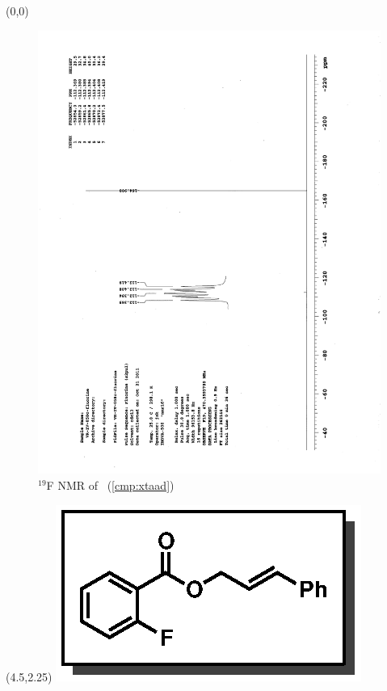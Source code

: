\clearpage
\begin{textblock}{20}(0,0)
\begin{figure}[htb]
\caption{$^{19}$F NMR of  \CMPxtaad\ (\ref{cmp:xtaad})}
\includegraphics[scale=0.75, trim = 0mm 0mm 0mm 5mm,
clip]{chp_asymmetric/images/nmr/xtaadF}
\vspace{-100pt}
\end{figure}
\end{textblock}
\begin{textblock}{1}(4.5,2.25)
\includegraphics[scale=0.8, angle=90]{chp_asymmetric/images/xtaad}
\end{textblock}
\clearpage


